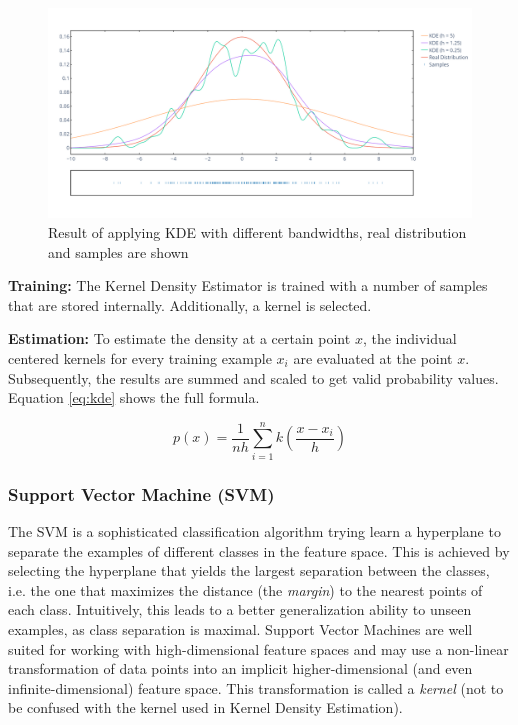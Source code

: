 \documentclass[
	ruledheaders=chapter,
	class=report,
	thesis={type=master, department=inf},
	accentcolor=1c,
	custommargins=true,
	marginpar=false,
	parskip=half-,
	fontsize=11pt,
]{tudapub}
\begin{document}
	\begin{figure}[tb]
		\centering
		\includegraphics[width=\textwidth]{kde.png}
		\caption{Result of applying KDE with different bandwidths, real distribution and samples are shown}
		\label{fig:kde}
	\end{figure} 

	\textbf{Training:} The Kernel Density Estimator is trained with a number of samples that are stored internally. Additionally, a kernel is selected.
	
	\textbf{Estimation:} To estimate the density at a certain point $x$, the individual centered kernels for every training example $x_i$ are evaluated at the point $x$. Subsequently, the results are summed and scaled to get valid probability values. Equation \ref{eq:kde} shows the full formula.
	
	\begin{equation}
		\label{eq:kde}
		p(x) = \frac{1}{nh}\sum_{i = 1}^{n} k\left(\frac{x - x_i}{h}\right)
	\end{equation}
		
	\subsubsection{Support Vector Machine (SVM)} 
	
	The SVM is a sophisticated classification algorithm trying learn a hyperplane to separate the examples of different classes in the feature space. This is achieved by selecting the hyperplane that yields the largest separation between the classes, i.e. the one that maximizes the distance (the \textit{margin}) to the nearest points of each class. Intuitively, this leads to a better generalization ability to unseen examples, as class separation is maximal. Support Vector Machines are well suited for working with high-dimensional feature spaces and may use a non-linear transformation of data points into an implicit higher-dimensional (and even infinite-dimensional) feature space. This transformation is called a \textit{kernel} (not to be confused with the kernel used in Kernel Density Estimation). 
	
\end{document}
